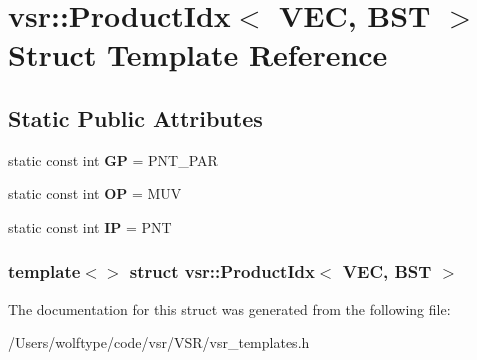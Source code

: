 \hypertarget{structvsr_1_1_product_idx_3_01_v_e_c_00_01_b_s_t_01_4}{\section{vsr\-:\-:Product\-Idx$<$ V\-E\-C, B\-S\-T $>$ Struct Template Reference}
\label{structvsr_1_1_product_idx_3_01_v_e_c_00_01_b_s_t_01_4}
}
\subsection*{Static Public Attributes}
\begin{DoxyCompactItemize}
\item 
\hypertarget{structvsr_1_1_product_idx_3_01_v_e_c_00_01_b_s_t_01_4_ab5a71f12cb3d55ce6a34dfa34403a997}{static const int {\bfseries G\-P} = P\-N\-T\-\_\-\-P\-A\-R}\label{structvsr_1_1_product_idx_3_01_v_e_c_00_01_b_s_t_01_4_ab5a71f12cb3d55ce6a34dfa34403a997}

\item 
\hypertarget{structvsr_1_1_product_idx_3_01_v_e_c_00_01_b_s_t_01_4_ad145a076a9b338384b080c24221539ba}{static const int {\bfseries O\-P} = M\-U\-V}\label{structvsr_1_1_product_idx_3_01_v_e_c_00_01_b_s_t_01_4_ad145a076a9b338384b080c24221539ba}

\item 
\hypertarget{structvsr_1_1_product_idx_3_01_v_e_c_00_01_b_s_t_01_4_a55fa7169d57d2e498cbfce6cc4147b4c}{static const int {\bfseries I\-P} = P\-N\-T}\label{structvsr_1_1_product_idx_3_01_v_e_c_00_01_b_s_t_01_4_a55fa7169d57d2e498cbfce6cc4147b4c}

\end{DoxyCompactItemize}
\subsubsection*{template$<$$>$ struct vsr\-::\-Product\-Idx$<$ V\-E\-C, B\-S\-T $>$}



The documentation for this struct was generated from the following file\-:\begin{DoxyCompactItemize}
\item 
/\-Users/wolftype/code/vsr/\-V\-S\-R/vsr\-\_\-templates.\-h\end{DoxyCompactItemize}
